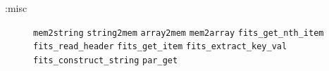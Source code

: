 \documentclass[twoside,11pt]{article}
\begin{document}
\begin{description}
\item[:misc]%
\mbox{}
\begin{flushleft}
\texttt{mem2string} \texttt{string2mem} \texttt{array2mem} 
\texttt{mem2array} \texttt{fits\_get\_nth\_item} \texttt{fits\_read\_header} 
\texttt{fits\_get\_item} \texttt{fits\_extract\_key\_val}
\texttt{fits\_construct\_string} \texttt{par\_get}
\end{flushleft}

\end{description}

\end{document}
